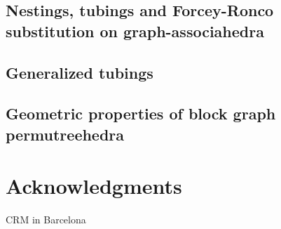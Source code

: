 \documentclass{amsart}
\theoremstyle{definition}
\begin{document}

\subsection{Nestings, tubings and Forcey-Ronco substitution on graph-associahedra}


\subsection{Generalized tubings}


\subsection{Geometric properties of block graph permutreehedra}







\section*{Acknowledgments}

CRM in Barcelona 



\label{sec:biblio}
\end{document}
